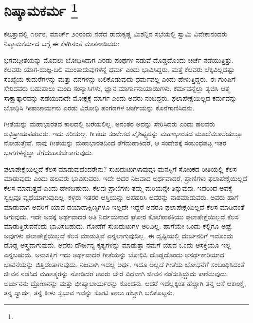 
\vspace{-1cm}

\chapter[ನಿಷ್ಕಾಮಕರ್ಮ ]{ನಿಷ್ಕಾಮಕರ್ಮ \protect\footnote{}}

ಕಲ್ಕತ್ತಾದಲ್ಲಿ ೧೮೯೮, ಮಾರ್ಚ್​ ೨೦ರಂದು ನಡೆದ ರಾಮಕೃಷ್ಣ ಮಿಶನ್ನಿನ ಸಭೆಯಲ್ಲಿ ಸ್ವಾಮಿ ವಿವೇಕಾನಂದರು ನಿಷ್ಕಾಮಕರ್ಮದ ಬಗ್ಗೆ ಈ ಕೆಳಗಿನಂತೆ ಮಾತನಾಡಿದರು:

ಭಗವದ್ಗೀತೆಯನ್ನು ಮೊದಲು ಬೋಧಿಸಿದಾಗ ಎರಡು ಪಂಥಗಳ ನಡುವೆ ದೊಡ್ಡದೊಂದು ಚರ್ಚೆ ನಡೆಯುತ್ತಿತ್ತು. ಕೆಲವರು ಯಾಗ-ಯಜ್ಞ-ಬಲಿ ಮುಂತಾದುವುಗಳನ್ನೆ ಧರ್ಮ ಎಂದು ಭಾವಿಸಿದ್ದರು. ಮತ್ತೆ ಕೆಲವರು ಲೆಕ್ಕವಿಲ್ಲದಷ್ಟು ಸಂಖ್ಯೆಯ ಕುದುರೆಗಳನ್ನು ಮತ್ತು ದನಗಳನ್ನು ಬಲಿಕೊಡುವುದು ಧರ್ಮವಲ್ಲ ಎಂದು ಹೇಳುತ್ತಿದ್ದರು. ಈ ಗುಂಪಿಗೆ ಸೇರಿದವರು ಬಹುಪಾಲು ಮಂದಿ ಸಂನ್ಯಾಸಿಗಳು, ಜ್ಞಾನ ಮಾರ್ಗಾನುಯಾಯಿಗಳು. ಕರ್ಮವನ್ನೆಲ್ಲಾ ತ್ಯಜಿಸಿ ಆತ್ಮ ಸಾಕ್ಷಾತ್ಕಾರವನ್ನು ಪಡೆಯುವುದೇ ಮೋಕ್ಷಕ್ಕೆ ಮಾರ್ಗ ಎಂದು ಅವರು ನಂಬಿದ್ದರು. ಫಲಾಪೇಕ್ಷೆಯಿಲ್ಲದ ಕರ್ಮವನ್ನು ಬೋಧಿಸಿ ಗೀತಾಚಾರ್ಯನು ಎರಡು ವಿರೋಧಿ ಪಂಗಡಗಳ ಚರ್ಚೆಯನ್ನು ಕೊನೆಗಾಣಿಸಿದನು.

ಗೀತೆಯನ್ನು ಮಹಾಭಾರತದ ಕಾಲದಲ್ಲಿ ಬರೆಯಲಿಲ್ಲ, ಅನಂತರ ಅದನ್ನು ಸೇರಿಸಿದರು ಎಂದು ಹಲವರು ಅಭಿಪ್ರಾಯಪಡುವರು. ಇದು ಸರಿಯಲ್ಲ. ಗೀತೆಯ ಸಂದೇಶದ ವೈಶಿಷ್ಟ್ಯವನ್ನು ಮಹಾಭಾರತದ ಮೂಲೆಮೂಲೆಯಲ್ಲೂ ನೋಡುತ್ತೇವೆ. ನಾವು ಗೀತೆಯನ್ನು ಮಹಾಭಾರತದಿಂದ ತೆಗೆದುಹಾಕಿದರೆ, ಆ ಸಂದೇಶಕ್ಕೆ ಸಂಬಂಧಪಟ್ಟ ಇತರ ಭಾಗಗಳನ್ನೆಲ್ಲಾ ತೆಗೆದುಹಾಕಬೇಕಾಗುವುದು.

ಫಲಾಪೇಕ್ಷೆಯಿಲ್ಲದೆ ಕೆಲಸ ಮಾಡುವುದೆಂದರೇನು? ಸುಖದುಃಖಗಳಾವುವೂ ಮನಸ್ಸಿಗೆ ಸೋಂಕದ ರೀತಿಯಲ್ಲಿ ಕೆಲಸ ಮಾಡುವುದು ಎಂದು ಹಲವರು ಭಾವಿಸುವರು. ಇದೇ ಅದರ ನಿಜವಾದ ಅರ್ಥವಾದರೆ, ಪ್ರಾಣಿಗಳು ಫಲಾಪೇಕ್ಷೆಯಿಲ್ಲದೆ ಕೆಲಸ ಮಾಡುತ್ತವೆ ಎಂದು ಹೇಳಬಹುದು. ಕೆಲವು ಪ್ರಾಣಿಗಳು ತಮ್ಮ ಮರಿಯನ್ನೇ ತಿನ್ನುವುವು. ಇದರಿಂದ ಅವಕ್ಕೆ ಸ್ವಲ್ಪವೂ ವ್ಯಥೆಯಾಗುವುದಿಲ್ಲ. ಕಳ್ಳರು ಇತರರ ಆಸ್ತಿಯನ್ನು ಅಪಹರಿಸಿ ಅವರನ್ನು ನಾಶಮಾಡುವರು. ಅವರು ಹಾಗೆ ಮಾಡುವಾಗ ಅವರಿಗೆ ಯಾವ ದಯಾದಾಕ್ಷಿಣ್ಯಗಳೂ ಇಲ್ಲದೇ ಇದ್ದರೆ ಅವರೂ ಫಲಾಪೇಕ್ಷೆಯಿಲ್ಲದೆ ಕೆಲಸ ಮಾಡಿದಂತೆ ಆಗುವುದು. ಇದೇ ಅದಕ್ಕೆ ಅರ್ಥವಾದರೆ ಅತಿ ನಿರ್ದಯನಾದ ಘೋರ ಕೊಲೆಪಾತಕಿಯು ಫಲಾಪೇಕ್ಷೆಯಿಲ್ಲದೆ ಕೆಲಸ ಮಾಡುತ್ತಿರುವನೆಂದು ಭಾವಿಸಬಹುದು. ಗೋಡೆಗೆ ಸುಖದುಃಖಗಳ ಅರಿವಿಲ್ಲ. ಹಾಗೆಯೇ ಒಂದು ಕಲ್ಲಿಗೂ ಅಷ್ಟೆ. ಅವುಗಳು ಫಲಾಪೇಕ್ಷೆಯಿಲ್ಲದೆ ಕೆಲಸ ಮಾಡುತ್ತಿವೆ ಎನ್ನಲಾಗುವುದಿಲ್ಲ. ಈ ದೃಷ್ಟಿಯಲ್ಲಿ ದುರ್ಜನರಿಗೆ ಇದೊಂದು ದೊಡ್ಡ ಅಸ್ತ್ರವಾಗುವುದು. ಅವರು ದೌರ್ಜನ್ಯ ಕೃತ್ಯಗಳನ್ನು ಮಾಡುತ್ತಾ ನಮಗೆ ಯಾವ ಒಂದು ಆಸಕ್ತಿಯೂ ಇಲ್ಲ ಎನ್ನಬಹುದು. ಅನಾಸಕ್ತಿಗೆ ಇದು ಅರ್ಥವಾದರೆ ಗೀತೆಯನ್ನು ಬೋಧಿಸಿ ದೊಡ್ಡದೊಂದು ಅನರ್ಥಕಾರಿಯಾದ ಭಾವನೆಯನ್ನು ಬಿತ್ತಿದಂತಾಗುವುದು. ನಿಜವಾಗಿ ಇದಲ್ಲ ಅರ್ಥ. ಇದೂ ಅಲ್ಲದೆ ಗೀತೆಯ ಬೋಧನೆಗೆ ಸಂಬಂಧಿಸಿದಂತೆ ಜೀವನ ನಡೆಸಿದ ಮಹಾತ್ಮರನ್ನು ನೋಡಿದರೆ ಅವರು ಬೇರೆ ವಿಧವಾಗಿ ಜೀವನ ನಡೆಸುತ್ತಿದ್ದುದು ಕಾಣಿಸುವುದು. ಅರ್ಜುನನು ದ್ರೋಣನನ್ನು ಮತ್ತು ಭೀಷ್ಮಾಚಾರ್ಯರನ್ನು ಕೊಂದನು. ಆದರೆ ಇದೆಲ್ಲಕ್ಕಿಂತ ಹೆಚ್ಚಾಗಿ ತನ್ನ ಆಸೆ ಆಕಾಂಕ್ಷೆ, ತನ್ನ ಸ್ವಾರ್ಥ, ತನ್ನ ಕೀಳು ಸ್ವಭಾವ ಇವನ್ನು ಕೋಟಿ ಪಾಲು ಹೆಚ್ಚಾಗಿ ಬಲಿಕೊಟ್ಟನು.

